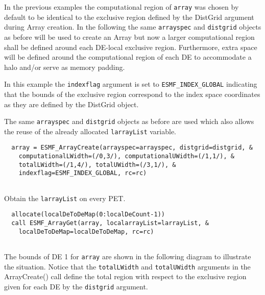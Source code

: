    In the previous examples the computational region of {\tt array} was chosen 
   by default to be identical to the exclusive region defined by the DistGrid
   argument during Array creation. In the following the same {\tt arrayspec} and
   {\tt distgrid} objects as before will be used to create an Array but now a 
   larger computational region shall be defined around each DE-local exclusive 
   region. Furthermore, extra space will be defined around the computational
   region of each DE to accommodate a halo and/or serve as memory padding.
  
   In this example the {\tt indexflag} argument is set to 
   {\tt ESMF\_INDEX\_GLOBAL} indicating that the bounds of the exclusive region
   correspond to the index space coordinates as they are defined by the DistGrid
   object.
  
   The same {\tt arrayspec} and {\tt distgrid} objects as before are used
   which also allows the reuse of the already allocated {\tt larrayList}
   variable. 

 \begin{verbatim}
  array = ESMF_ArrayCreate(arrayspec=arrayspec, distgrid=distgrid, &
    computationalLWidth=(/0,3/), computationalUWidth=(/1,1/), &
    totalLWidth=(/1,4/), totalUWidth=(/3,1/), &
    indexflag=ESMF_INDEX_GLOBAL, rc=rc)
 
\end{verbatim}
 

   Obtain the {\tt larrayList} on every PET. 

 \begin{verbatim}
  allocate(localDeToDeMap(0:localDeCount-1))
  call ESMF_ArrayGet(array, localarrayList=larrayList, &
    localDeToDeMap=localDeToDeMap, rc=rc)
 
\end{verbatim}
 

   The bounds of DE 1 for {\tt array} are shown in the following 
   diagram to illustrate the situation. Notice that the {\tt totalLWidth} and
   {\tt totalUWidth} arguments in the ArrayCreate() call define the total region 
   with respect to the exclusive region given for each DE by the {\tt distgrid} 
   argument.
   
